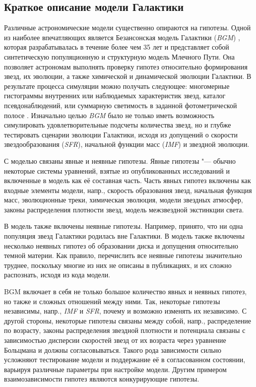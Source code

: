 \subsection{Краткое описание модели Галактики}
Различные астрономические модели существенно опираются на гипотезы. Одной из наиболее впечатляющих является 
Безансонская модель Галактики (\textit{BGM}) \cite{czekaj2014besanccon, robin2003synthetic}, которая разрабатывалась 
в течение более чем 35 лет и представляет собой синтетическую популяционную и структурную модель Млечного Пути. 
Она позволяет астрономам выполнять проверку гипотез относительно формирования звезд, их эволюции, а также химической 
и динамической эволюции Галактики. В результате процесса симуляции можно получать следующее: многомерные гистограммы 
внутренних или наблюдаемых характеристик звезд, каталог псевдонаблюдений, или суммарную светимость в заданной 
фотометрической полосе \cite{czekaj2012galaxy}. Изначально целью \textit{BGM} было не только иметь возможность 
симулировать удовлетворительные подсчеты количества звезд, но и глубже тестировать сценарии эволюции Галактики, 
исходя из допущений о скорости звездообразования (\textit{SFR}), начальной функции масс (\textit{IMF}) и звездной эволюции.

С моделью связаны явные и неявные гипотезы. Явные гипотезы "--- обычно некоторые системы уравнений, взятые из 
опубликованных исследований и включенные в модель как её составная часть. Часть явных гипотез включены как входные 
элементы модели, напр., скорость образования звезд, начальная функция масс, эволюционные треки, химическая эволюция, 
модели звездных атмосфер, законы распределения плотности звезд, модель межзвездной экстинкции света.

В модель также включены неявные гипотезы. Например, принято, что ни одна популяция звезд Галактики родилась вне 
Галактики. В модель также включены несколько неявных гипотез об образовании диска и допущения относительно темной 
материи. Как правило, перечислить все неявные гипотезы значительно труднее, поскольку многие из них не описаны в 
публикациях, и их сложно распознать, исходя из кода модели.

BGM включает в себя не только большое количество явных и неявных гипотез, но также и сложных отношений между ними. 
Так, некоторые гипотезы независимы, напр., \textit{IMF} и \textit{SFR}, почему и возможно изменять их независимо. 
С другой стороны, некоторые гипотезы связаны между собой, напр., распределение по возрасту, законы распределения 
звездной плотности и потенциала связаны с зависимостью дисперсии скоростей звезд от их возраста через уравнение 
Больцмана и должны согласовываться. Такого рода зависимости сильно усложняют тестирование модели и поддержание 
её в согласованном состоянии, варьируя различные параметры при настройке модели. Другим примером взаимозависимости 
гипотез являются конкурирующие гипотезы.

